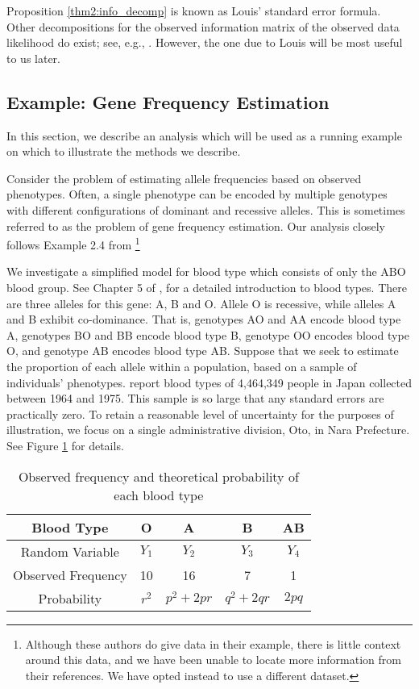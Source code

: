 \documentclass[11pt, oneside]{article}   	%
\begin{document}
Proposition \ref{thm2:info_decomp} is known as Louis' standard error formula. Other decompositions for the observed information matrix of the observed data likelihood do exist; see, e.g., \citet{Oak99,McL08}. However, the one due to Louis will be most useful to us later.

\subsection{Example: Gene Frequency Estimation}
\label{sec:eg-genes}

In this section, we describe an analysis which will be used as a running example on which to illustrate the methods we describe. 

Consider the problem of estimating allele frequencies based on observed phenotypes. Often, a single phenotype can be encoded by multiple genotypes with different configurations of dominant and recessive alleles. This is sometimes referred to as the problem of gene frequency estimation. Our analysis closely follows Example 2.4 from \citet{McL08}\footnote{Although these authors do give data in their example, there is little context around this data, and we have been unable to locate more information from their references. We have opted instead to use a different dataset.}

We investigate a simplified model for blood type which consists of only the ABO blood group. See Chapter 5 of \citet{Dea05}, for a detailed introduction to blood types. There are three alleles for this gene: A, B and O. Allele O is recessive, while alleles A and B exhibit co-dominance. That is, genotypes AO and AA encode blood type A, genotypes BO and BB encode blood type B, genotype OO encodes blood type O, and genotype AB encodes blood type AB. Suppose that we seek to estimate the proportion of each allele within a population, based on a sample of individuals' phenotypes. \citet{Fuj78} report blood types of 4,464,349 people in Japan collected between 1964 and 1975. This sample is so large that any standard errors are practically zero. To retain a reasonable level of uncertainty for the purposes of illustration, we focus on a single administrative division, Oto, in Nara Prefecture. See Figure \ref{tab2:blood_type} for details.

\begin{table}
    \centering
    \caption{Observed frequency and theoretical probability of each blood type \citep{Fuj78}}
    \begin{tabular}{c|cccc}
        Blood Type & O & A & B & AB\\
        \hline
        Random Variable & $Y_1$ & $Y_2$ & $Y_3$ & $Y_4$\\
        Observed Frequency & 10 & 16 & 7 & 1\\
        Probability & $r^2$ & $p^2 + 2pr$ & $q^2 + 2qr$ & $2pq$
    \end{tabular}
    \label{tab2:blood_type}
\end{table}
\end{document}
